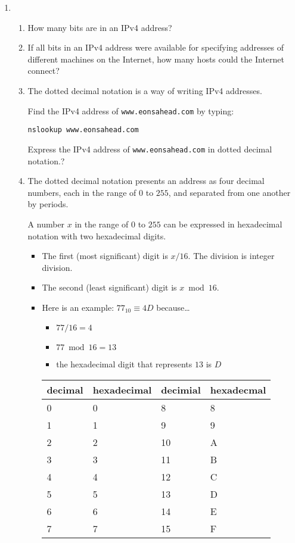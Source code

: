 \documentclass[twoside]{article}
\newenvironment{answer}
  {\vspace*{0.2cm} \rule{12cm}{0.04cm} \vspace*{0.2cm}}
  {\vspace*{0.2cm}}
\begin{document}
\begin{enumerate}
\begin{answer}
    \end{answer}

  \item
  \begin{enumerate}
    \item How many bits are in an IPv4 address?

    \item If all bits in an IPv4 address were available for specifying
      addresses of different machines on the Internet, how many hosts
      could the Internet connect?

    \item The dotted decimal notation is a way of writing IPv4 addresses.
      
      Find the IPv4 address of \verb+www.eonsahead.com+ by typing:

      \verb+nslookup www.eonsahead.com+

      Express the IPv4 address of \verb+www.eonsahead.com+ in
      dotted decimal notation.?

    \item The dotted decimal notation presents an address as
      four decimal numbers, each in the range of $0$ to $255$,
      and separated from one another by periods.

      A number $x$ in the range of $0$ to $255$ can be expressed
      in hexadecimal notation with two hexadecimal digits.

    \begin{itemize}
      \item The first (most significant) digit is $x / 16$.
        The division is integer division.

      \item The second (least significant) digit is $x \bmod 16$.

      \item Here is an example: $77_{10} \equiv 4D$ because\ldots
      \begin{itemize}
        \item  $77 / 16 = 4$
        \item $77 \bmod 16 = 13$
        \item the hexadecimal digit that represents $13$ is $D$
        \end{itemize}

    \begin{tabular}{ll|ll}
      \textbf{decimal} & \textbf{hexadecimal} & \textbf{decimial} & \textbf{hexadecmal} \\ \hline
      0 & 0 & 8 & 8 \\
      1 & 1 & 9 & 9 \\
      2 & 2 & 10 & A \\
      3 & 3 & 11 & B \\
      4 & 4 & 12 & C \\
      5 & 5 & 13 & D \\
      6 & 6 & 14 & E \\
      7 & 7 & 15 & F
      \end{tabular}


\end{itemize}
\end{enumerate}
\end{enumerate}
\end{document}
